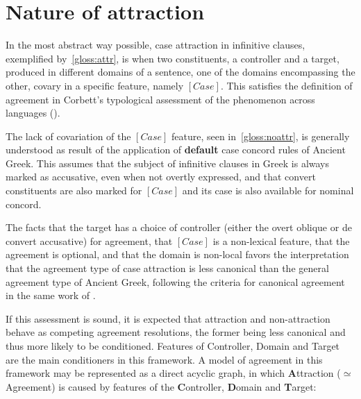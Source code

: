 \documentclass[a4paper, 12pt, article]{memoir}
\begin{document}

\chapter{Nature of attraction} %

In the most abstract way possible, case attraction in infinitive clauses,
exemplified by~\ref{gloss:attr}, is when two constituents, a controller and a
target, produced in different domains of a sentence, one of the domains
encompassing the other, covary in a specific feature, namely $[Case]$.
This satisfies the definition of agreement in Corbett's typological assessment
of the phenomenon across languages (\citeyear[pp.\ 4--7]{Corbett2006}).

The lack of covariation of the $[Case]$ feature, seen in~\ref{gloss:noattr}, is
generally understood as result of the application of \textbf{default} case
concord rules of Ancient Greek.
This assumes that the subject of infinitive clauses in Greek is always marked as
accusative, even when not overtly expressed, and that convert constituents are
also marked for $[Case]$ and its case is also available for nominal concord.

The facts that the target has a choice of controller (either the overt oblique or
de convert accusative) for agreement, that $[Case]$ is a non\hyp{}lexical
feature, that the agreement is optional, and that the domain is non\hyp{}local
favors the interpretation that the agreement type of case attraction is less
canonical than the general agreement type of Ancient Greek, following the
criteria for canonical agreement in the same work of \textcite[pp.\
  8ff.]{Corbett2006}.

If this assessment is sound, it is expected that attraction and
non\hyp{}attraction behave as competing agreement resolutions, the former being
less canonical and thus more likely to be conditioned.
Features of Controller, Domain and Target are the main conditioners in this
framework.
A model of agreement in this framework may be represented as a direct acyclic
graph, in which \textbf{A}ttraction ($\simeq$ Agreement) is caused by features
of the \textbf{C}ontroller, \textbf{D}omain and \textbf{T}arget:
\end{document}
